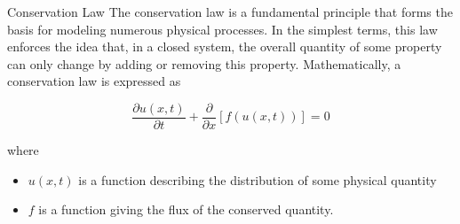 \documentclass[10pt]{beamer}
\begin{document}
\begin{frame}{Conservation Law}
  The conservation law is a fundamental principle that forms the basis for modeling numerous physical processes.  In the simplest terms, this law enforces the idea that, in a closed system, the overall quantity of some property can only change by adding or removing this property.  Mathematically, a conservation law is expressed as
  
  \begin{equation}
    \frac{\partial u(x,t)}{\partial t} + \frac{\partial}{\partial x}[f(u(x,t))]=0\label{eq:Conservation Law}
  \end{equation}
  
  where 
  \begin{itemize}
    \item $u(x,t)$ is a function describing the distribution of some physical quantity 
    \item $f$ is a function giving the flux of the conserved quantity.
  \end{itemize}

\end{frame}
\end{document}
